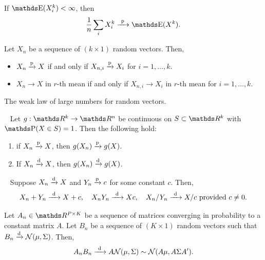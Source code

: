 \begin{theorem}
  If \(\E(X_i^k) < \infty\), then
  \[
    \frac{1}{n} \sum_i X_i^k \longprobto \E(X^k).
  \]
\end{theorem}

\begin{proposition}
  Let \(X_n\) be a sequence of \((k \times 1)\) random vectors.
  Then,
  \begin{itemize}
    \item \(X_n \xrightarrow{\mathrm{p}} X\) if and only if \(X_{n, i} \xrightarrow{\mathrm{p}} X_i\) for \(i = 1, \dots, k\). 
    \item \(X_n \to X\) in \(r\)-th mean if and only if \(X_{n, i} \to X_i\) in \(r\)-th mean for \(i = 1, \dots, k\).
  \end{itemize}
\end{proposition}

\begin{corollary}
  The weak law of large numbers for random vectors.
\end{corollary}

\begin{theorem}~
  Let \(g: \RR^k \to \RR^n\) be continuous on \(S \subset \RR^k\) with \(\P(X \in S) = 1\).
  Then the following hold:
  \begin{enumerate}[label=(\roman*)]
    \item if \(X_n \xrightarrow{\mathrm{p}} X\), then \(g(X_n) \xrightarrow{\mathrm{p}} g(X)\). 
    \item If \(X_n \xrightarrow{\mathrm{d}} X\), then \(g(X_n) \xrightarrow{\mathrm{d}} g(X)\). 
  \end{enumerate}
\end{theorem}

\begin{theorem}~
  Suppose \(X_n \xrightarrow{\mathrm{d}} X\) and \(Y_n \xrightarrow{\mathrm{p}} c\) for some constant \(c\).
  Then,
  \[
    X_n + Y_n \xrightarrow{\ \mathrm{d}\ } X + c, \quad
    X_n Y_n \xrightarrow{\ \mathrm{d}\ } Xc, \quad
    X_n / Y_n \xrightarrow{\ \mathrm{d}\ } X / c \text{ provided } c \neq 0.
  \] 
\end{theorem}

\begin{proposition}
  Let \(A_n \in \RR^{P \times K}\) be a sequence of matrices converging in probability to a constant matrix \(A\).
  Let \(B_n\) be a sequence of \((K \times 1)\) random vectors such that \(B_n \xrightarrow{\mathrm{d}} \mathcal{N}(\mu, \Sigma)\).
  Then,
  \[
    A_n B_n \xrightarrow{\ \mathrm{d}\ } A \mathcal{N}(\mu, \Sigma) \sim \mathcal{N}(A \mu, A \Sigma A').
  \]
\end{proposition}

